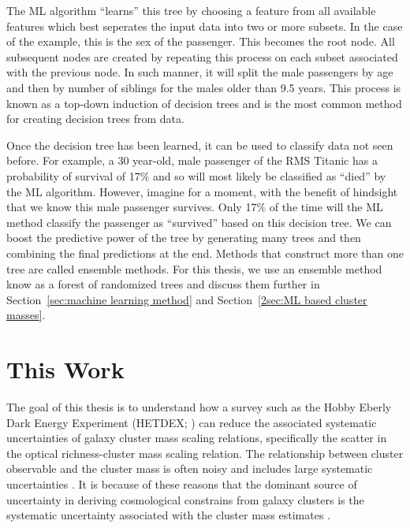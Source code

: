 The ML algorithm ``learns'' this tree by choosing a feature from all available features which best seperates the input data into two or more subsets. In the case of the example, this is the sex of the passenger. This becomes the root node. All subsequent nodes are created by repeating this process on each subset associated with the previous node. In such manner, it will split the male passengers by age and then by number of siblings for the males older than 9.5 years. This process is known as a top-down induction of decision trees and is the most common method for creating decision trees from data.

Once the decision tree has been learned, it can be used to classify data not seen before. For example, a 30 year-old, male passenger of the RMS Titanic has a probability of survival of 17\% and so will most likely be classified as ``died'' by the ML algorithm. However, imagine for a moment, with the benefit of hindsight that we know this male passenger survives. Only 17\% of the time will the ML method classify the passenger as ``survived'' based on this decision tree. We can boost the predictive power of the tree by generating many trees and then combining the final predictions at the end. Methods that construct more than one tree are called ensemble methods. For this thesis, we use an ensemble method know as a forest of randomized trees and discuss them further in Section~\ref{sec:machine learning method} and Section~\ref{2sec:ML based cluster masses}.

\section{This Work}
The goal of this thesis is to understand how a survey such as the Hobby Eberly Dark Energy Experiment (HETDEX; \citealt{Hill2008}) can reduce the associated systematic uncertainties of galaxy cluster mass scaling relations, specifically the scatter in the optical richness-cluster mass scaling relation. The relationship between cluster observable and the cluster mass is often noisy and includes large systematic uncertainties . It is because of these reasons that the dominant source of uncertainty in deriving cosmological constrains from galaxy clusters is the systematic uncertainty associated with the cluster mass estimates .

